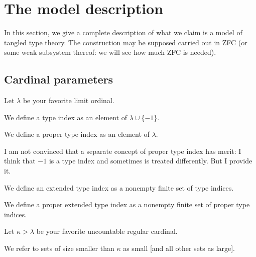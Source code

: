 \chapter{The model description}

In this section, we give a complete description of what we claim is a model of tangled type theory.  The construction may be supposed carried out in ZFC (or some weak subsystem thereof:  we will see how much ZFC is needed).

\section{Cardinal parameters}

\begin{definition}
\label {def:lambda}
Let $\lambda$ be your favorite limit ordinal.
\end{definition}

\begin{definition}
\label {def:type-index}   
We define a type index as an element of $\lambda \cup \{-1\}$.
\end{definition}

\begin{definition}
\label {def:proper-type-index}  
We define a proper type index as an element of $\lambda$.

I am not convinced that a separate concept of proper type index has merit:  I think that $-1$ is a type index and
sometimes is treated differently.  But I provide it.
\end{definition}

\begin{definition}
\label {def:extended-type-index} 
We define an extended type index as a nonempty finite set of type indices.
\end{definition}

\begin{definition}
\label {def:proper-extended-type-index} 
We define a proper extended type index as a nonempty finite set of proper type indices.

\end{definition}

\begin{definition}
\label {def:kappa}  
Let $\kappa>\lambda$ be your favorite uncountable regular cardinal.
\end{definition}

\begin{definition}
\label {def:small} 
We refer to sets of size smaller than $\kappa$ as small [and all other sets as large].
\end{definition}

